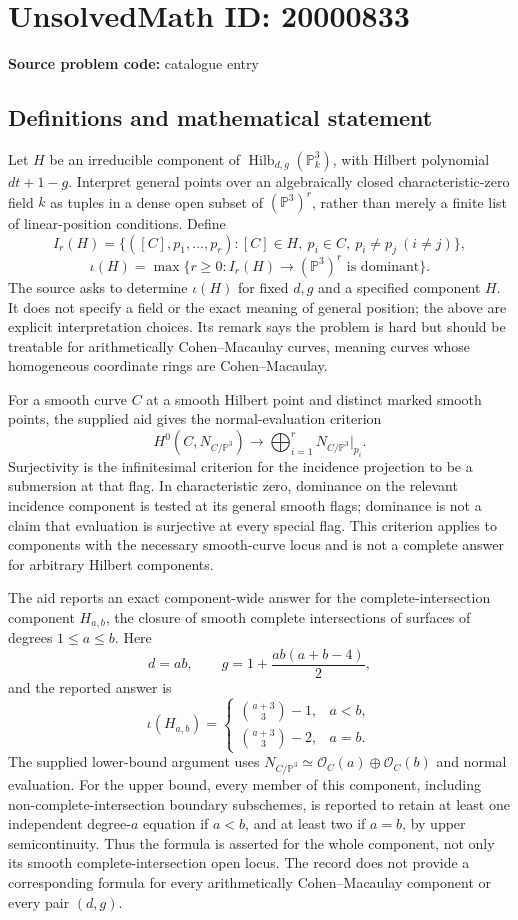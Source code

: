 \documentclass[11pt]{article}
\newcommand{\PP}{\mathbb{P}}
\begin{document}
\section*{UnsolvedMath ID: 20000833}
\textbf{Source problem code:} catalogue entry
\subsection{Definitions and mathematical statement}
Let \(H\) be an irreducible component of \(\operatorname{Hilb}_{d,g}(\PP_k^3)\), with Hilbert polynomial \(dt+1-g\). Interpret general points over an algebraically closed characteristic-zero field \(k\) as tuples in a dense open subset of \((\PP^3)^r\), rather than merely a finite list of linear-position conditions. Define
\[
 I_r(H)=\{([C],p_1,\ldots,p_r):[C]\in H,\ p_i\in C,
 \ p_i\ne p_j\ (i\ne j)\},
\]
\[
 \iota(H)=\max\{r\ge0:I_r(H)\longrightarrow(\PP^3)^r
 \text{ is dominant}\}.
\]
The source asks to determine \(\iota(H)\) for fixed \(d,g\) and a specified component \(H\). It does not specify a field or the exact meaning of general position; the above are explicit interpretation choices. Its remark says the problem is hard but should be treatable for arithmetically Cohen--Macaulay curves, meaning curves whose homogeneous coordinate rings are Cohen--Macaulay.

For a smooth curve \(C\) at a smooth Hilbert point and distinct marked smooth points, the supplied aid gives the normal-evaluation criterion
\[
 H^0(C,N_{C/\PP^3})\longrightarrow
 \bigoplus_{i=1}^r N_{C/\PP^3}|_{p_i}.
\]
Surjectivity is the infinitesimal criterion for the incidence projection to be a submersion at that flag. In characteristic zero, dominance on the relevant incidence component is tested at its general smooth flags; dominance is not a claim that evaluation is surjective at every special flag. This criterion applies to components with the necessary smooth-curve locus and is not a complete answer for arbitrary Hilbert components.

The aid reports an exact component-wide answer for the complete-intersection component \(H_{a,b}\), the closure of smooth complete intersections of surfaces of degrees \(1\le a\le b\). Here
\[
 d=ab,\qquad g=1+\frac{ab(a+b-4)}2,
\]
and the reported answer is
\[
 \iota(H_{a,b})=
 \begin{cases}
 \binom{a+3}{3}-1,&a<b,\\
 \binom{a+3}{3}-2,&a=b.
 \end{cases}
\]
The supplied lower-bound argument uses
\(N_{C/\PP^3}\simeq\mathcal O_C(a)\oplus\mathcal O_C(b)\)
and normal evaluation. For the upper bound, every member of this component, including non-complete-intersection boundary subschemes, is reported to retain at least one independent degree-\(a\) equation if \(a<b\), and at least two if \(a=b\), by upper semicontinuity. Thus the formula is asserted for the whole component, not only its smooth complete-intersection open locus. The record does not provide a corresponding formula for every arithmetically Cohen--Macaulay component or every pair \((d,g)\).
\end{document}
